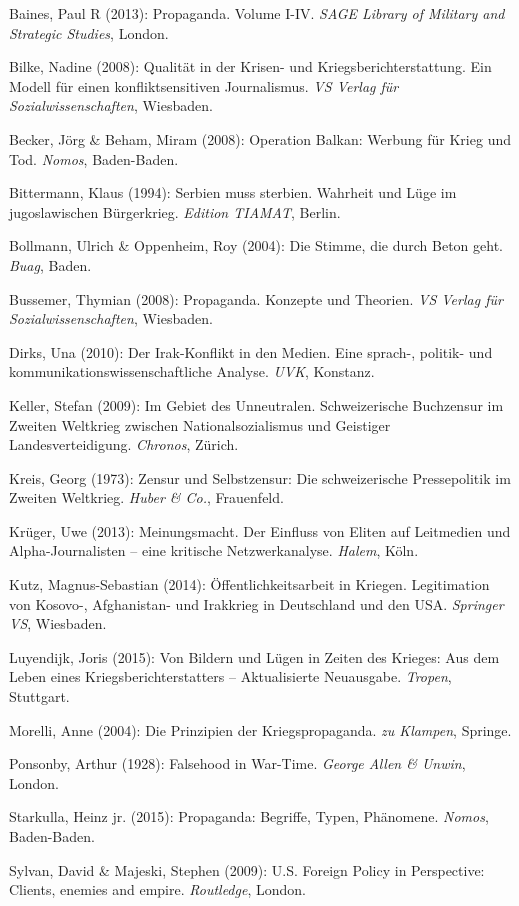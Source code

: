 Baines, Paul R (2013): Propaganda. Volume I-IV. \emph{SAGE Library of
Military and Strategic Studies}, London.

Bilke, Nadine (2008): Qualität in der Krisen- und
Kriegsberichterstattung. Ein Modell für einen konfliktsensitiven
Journalismus. \emph{VS Verlag für Sozialwissenschaften}, Wiesbaden.

Becker, Jörg \& Beham, Miram (2008): Operation Balkan: Werbung für Krieg
und Tod. \emph{Nomos}, Baden-Baden.

Bittermann, Klaus (1994): Serbien muss sterbien. Wahrheit und Lüge im
jugoslawischen Bürgerkrieg. \emph{Edition TIAMAT}, Berlin.

Bollmann, Ulrich \& Oppenheim, Roy (2004): Die Stimme, die durch Beton
geht. \emph{Buag}, Baden.

Bussemer, Thymian (2008): Propaganda. Konzepte und Theorien. \emph{VS
Verlag für Sozialwissenschaften}, Wiesbaden.

Dirks, Una (2010): Der Irak-Konflikt in den Medien. Eine sprach-,
politik- und kommunikationswissenschaftliche Analyse. \emph{UVK},
Konstanz.

Keller, Stefan (2009): Im Gebiet des Unneutralen. Schweizerische
Buchzensur im Zweiten Weltkrieg zwischen Nationalsozialismus und
Geistiger Landesverteidigung. \emph{Chronos}, Zürich.

Kreis, Georg (1973): Zensur und Selbstzensur: Die schweizerische
Pressepolitik im Zweiten Weltkrieg. \emph{Huber \& Co.}, Frauenfeld.

Krüger, Uwe (2013): Meinungsmacht. Der Einfluss von Eliten auf
Leitmedien und Alpha-Journalisten -- eine kritische Netzwerkanalyse.
\emph{Halem}, Köln.

Kutz, Magnus-Sebastian (2014): Öffentlichkeitsarbeit in Kriegen.
Legitimation von Kosovo-, Afghanistan- und Irakkrieg in Deutschland und
den USA. \emph{Springer VS}, Wiesbaden.

Luyendijk, Joris (2015): Von Bildern und Lügen in Zeiten des Krieges:
Aus dem Leben eines Kriegsberichterstatters -- Aktualisierte Neuausgabe.
\emph{Tropen}, Stuttgart.

Morelli, Anne (2004): Die Prinzipien der Kriegspropaganda. \emph{zu
Klampen}, Springe.

Ponsonby, Arthur (1928): Falsehood in War-Time. \emph{George Allen \&
Unwin}, London.

Starkulla, Heinz jr. (2015): Propaganda: Begriffe, Typen, Phänomene.
\emph{Nomos}, Baden-Baden.

Sylvan, David \& Majeski, Stephen (2009): U.S. Foreign Policy in
Perspective: Clients, enemies and empire. \emph{Routledge}, London.

